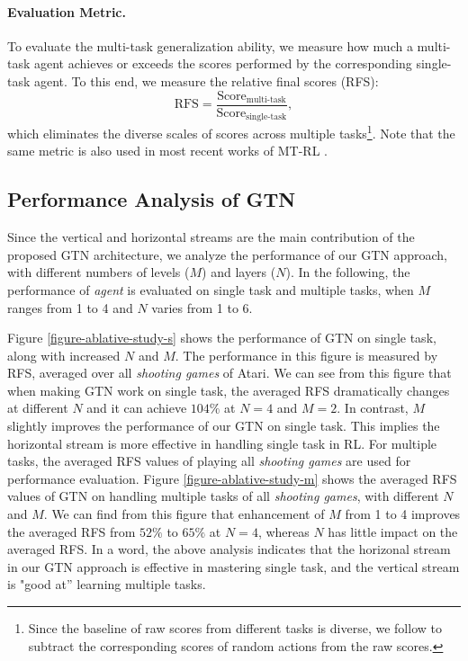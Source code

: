 \documentclass[letterpaper]{article} %
\begin{document}
\paragraph{Evaluation Metric.} To evaluate the multi-task generalization ability, we measure how much a multi-task agent achieves or exceeds the scores performed by the corresponding single-task agent. To this end, we measure the relative final scores (RFS):
\begin{equation}
\label{eva}
\textrm{RFS}=\frac{\text{Score}_{\text{multi-task}}}{\text{Score}_{\text{single-task}}},
\end{equation}
which eliminates the diverse scales of scores across multiple tasks\footnote{Since the baseline of raw scores from different tasks is diverse, we follow \cite{mnih2015human} to subtract the corresponding scores of random actions from the raw scores.}. Note that the same metric is also used in most recent works of MT-RL \cite{rusu2015policy,parisotto16_actormimic}.

\subsection{Performance Analysis of GTN}
\label{section-ablative-study}
Since the vertical and horizontal streams are the main contribution of the proposed GTN architecture, we analyze the performance of our GTN approach, with different numbers of levels ($M$) and layers ($N$).
In the following, the performance of \textit{agent} is evaluated on single task and multiple tasks, when $M$ ranges from 1 to 4 and $N$ varies from 1 to 6.

Figure \ref{figure-ablative-study-s} shows the performance of GTN on single task, along with increased $N$ and $M$.
The performance in this figure is measured by RFS, averaged over all \textit{shooting games} of Atari.
We can see from this figure that when making GTN work on single task, the averaged RFS dramatically changes at different $N$ and it can achieve $104\%$ at $N=4$ and $M=2$.
In contrast, $M$ slightly improves the performance of our GTN on single task.
This implies the horizontal stream is more effective in handling single task in RL.
For multiple tasks, the averaged RFS values of playing all \textit{shooting games} are used for performance evaluation.
Figure \ref{figure-ablative-study-m} shows the averaged RFS values of GTN on handling multiple tasks of all \textit{shooting games}, with different $N$ and $M$.
We can find from this figure that enhancement of $M$ from 1 to 4 improves the averaged RFS from $52\%$ to $65\%$ at $N=4$, whereas $N$ has little impact on the averaged RFS.
In a word, the above analysis indicates that the horizonal stream in our GTN approach is effective in mastering single task, and the vertical stream is "good at'' learning multiple tasks.
\end{document}
